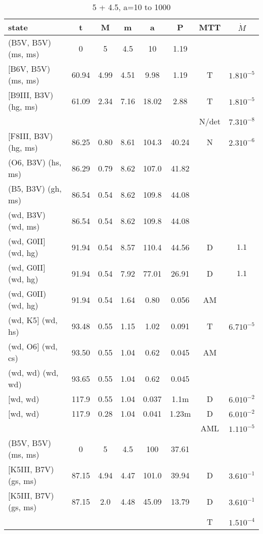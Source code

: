 \documentclass{article}
\begin{document}
\begin{table}
\caption{ 5 + 4.5, a=10 to 1000}
\begin{tabular}{p{4cm}ccccccc}
\hline
state 		    	& t 	& M	& m	& a	& P	& MTT	&$\dot{M}$		\\ \hline 
(B5V, B5V) (ms, ms)	& 0	& 5	& 4.5	& 10	& 1.19	&       &			\\
$[$B6V, B5V) (ms, ms)	& 60.94	& 4.99	& 4.51	& 9.98	& 1.19	& T	& $1.8 10^{-5}$		\\
$[$B9III, B3V) (hg, ms)	& 61.09	& 2.34	& 7.16	& 18.02	& 2.88	& T	& $1.8 10^{-5}$		\\
			&	& 	&	&	&	& N/det	& $7.3 10^{-8}$		\\
$[$F8III, B3V) (hg, ms)	& 86.25	& 0.80	& 8.61	& 104.3	& 40.24	& N	& $2.3 10^{-6}$		\\
(O6, B3V) (hs, ms)	& 86.29	& 0.79	& 8.62	& 107.0	& 41.82	& 	&               	\\
(B5, B3V) (gh, ms)	& 86.54	& 0.54	& 8.62	& 109.8	& 44.08	& 	&               	\\
(wd, B3V) (wd, ms)	& 86.54	& 0.54	& 8.62	& 109.8	& 44.08	& 	&               	\\
(wd, G0II$]$ (wd, hg)	& 91.94	& 0.54	& 8.57	& 110.4	& 44.56	& D	& $1.1$	  		\\
(wd, G0II$]$ (wd, hg)	& 91.94	& 0.54	& 7.92	& 77.01	& 26.91	& D	& $1.1$	  		\\
(wd, G0II) (wd, hg)	& 91.94	& 0.54	& 1.64	& 0.80	& 0.056	& AM	&      	  		\\
(wd, K5$]$ (wd, hs)	& 93.48	& 0.55	& 1.15	& 1.02	& 0.091	& T	&  $6.7 10^{-5}$	\\
(wd, O6$]$ (wd, cs)	& 93.50	& 0.55	& 1.04	& 0.62	& 0.045	& AM	&                	\\
(wd, wd) (wd, wd)	& 93.65	& 0.55	& 1.04	& 0.62	& 0.045	&   	&                	\\
$[$wd, wd)       		& 117.9	& 0.55	& 1.04	& 0.037	& 1.1m 	& D 	& $6.0 10^{-2}$		\\
$[$wd, wd)       		& 117.9	& 0.28	& 1.04	& 0.041	& 1.23m	& D  	& $6.0 10^{-2}$		\\
			&	& 	&	&	&	& AML	& $1.1 10^{-5}$		\\ 
\hline
(B5V, B5V) (ms, ms)	& 0	& 5	& 4.5	& 100	& 37.61	&       &			\\
$[$K5III, B7V) (gs, ms)	& 87.15	& 4.94	& 4.47	& 101.0	& 39.94	& D	& $3.6 10^{-1}$		\\
$[$K5III, B7V) (gs, ms)	& 87.15	& 2.0 	& 4.48	& 45.09	& 13.79	& D	& $3.6 10^{-1}$		\\
			&	& 	&	&	&	& T	& $1.5 10^{-4}$		\\

\end{tabular}
\end{table}
\end{document}
